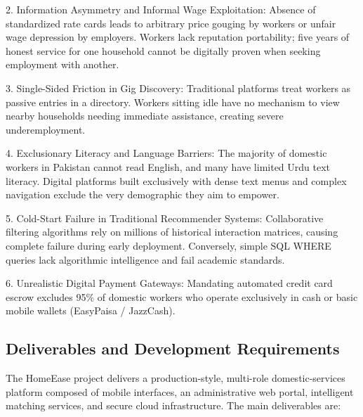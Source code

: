 \documentclass[12pt,a4paper]{article}
\begin{document}
2. Information Asymmetry and Informal Wage Exploitation: Absence of standardized rate cards leads to arbitrary price gouging by workers or unfair wage depression by employers. Workers lack reputation portability; five years of honest service for one household cannot be digitally proven when seeking employment with another.

3. Single-Sided Friction in Gig Discovery: Traditional platforms treat workers as passive entries in a directory. Workers sitting idle have no mechanism to view nearby households needing immediate assistance, creating severe underemployment.

4. Exclusionary Literacy and Language Barriers: The majority of domestic workers in Pakistan cannot read English, and many have limited Urdu text literacy. Digital platforms built exclusively with dense text menus and complex navigation exclude the very demographic they aim to empower.

5. Cold-Start Failure in Traditional Recommender Systems: Collaborative filtering algorithms rely on millions of historical interaction matrices, causing complete failure during early deployment. Conversely, simple SQL WHERE queries lack algorithmic intelligence and fail academic standards.

6. Unrealistic Digital Payment Gateways: Mandating automated credit card escrow excludes 95\% of domestic workers who operate exclusively in cash or basic mobile wallets (EasyPaisa / JazzCash).

\subsection{Deliverables and Development Requirements}
The HomeEase project delivers a production-style, multi-role domestic-services platform composed of mobile interfaces, an administrative web portal, intelligent matching services, and secure cloud infrastructure. The main deliverables are:
\end{document}
